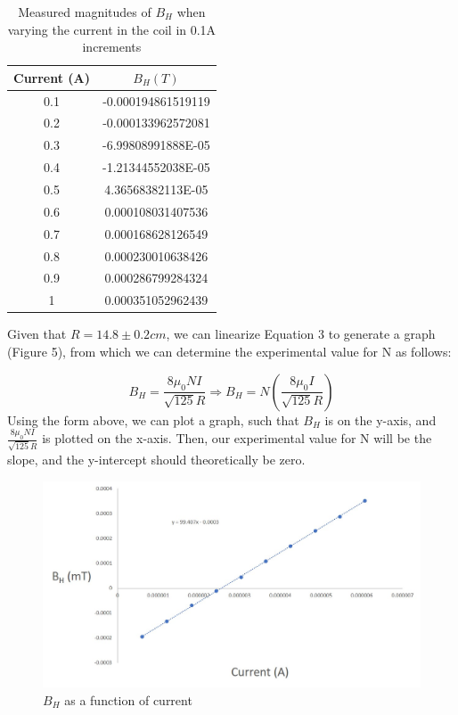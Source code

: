 \documentclass[letterpaper]{article}
\begin{document}
\begin{table}[H]
\centering
\begin{tabular}{|c|c|}
\hline
Current (A) & $B_H (T)$          \\ \hline
0.1                               & -0.000194861519119 \\ \hline
0.2                               & -0.000133962572081 \\ \hline
0.3                               & -6.99808991888E-05 \\ \hline
0.4                               & -1.21344552038E-05 \\ \hline
0.5                               & 4.36568382113E-05  \\ \hline
0.6                               & 0.000108031407536  \\ \hline
0.7                               & 0.000168628126549  \\ \hline
0.8                               & 0.000230010638426  \\ \hline
0.9                               & 0.000286799284324  \\ \hline
1                                 & 0.000351052962439  \\ \hline
\end{tabular}
\caption{Measured magnitudes of $B_H$ when varying the current in the coil in 0.1A increments}
\end{table}

Given that $R=14.8 \pm 0.2 cm$, we can linearize Equation 3 to
generate a graph (Figure 5), from which we can determine the experimental
value for N  as follows:

$$ B_H = \frac{8\mu_0NI}{\sqrt{125}R} \Rightarrow B_H = N\left( \frac{8\mu_0I}{\sqrt{125}R} \right)  $$
Using the form above, we can plot a graph, such that
$B_H$ is on the y-axis, and $\frac{8\mu_0NI}{\sqrt{125}R}$ is plotted on the x-axis.
Then, our experimental value for N will be the slope, and the y-intercept should theoretically be zero.
\begin{figure}[H]
  \centering
  \includegraphics[width=\textwidth]{p2graph.jpg}
  \caption{$B_H$ as a function of current}
\end{figure}
\end{document}
